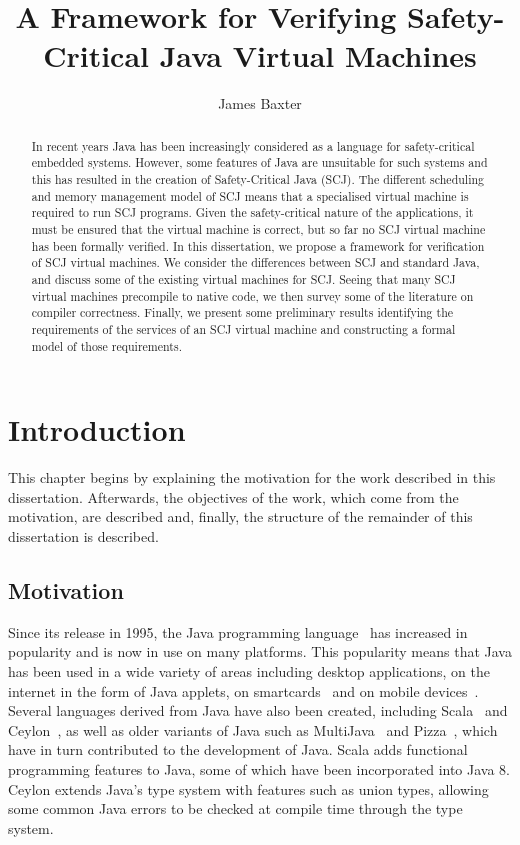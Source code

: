 \documentclass[a4paper,10pt]{report}
\title{A Framework for Verifying Safety-Critical Java Virtual Machines}
\author{James Baxter}
\date{}
\begin{document}
\maketitle

\begin{abstract}
  In recent years Java has been increasingly considered as a language
  for safety-critical embedded systems.
  However, some features of Java are unsuitable for such systems and
  this has resulted in the creation of Safety-Critical Java (SCJ).
  The different scheduling and memory management model of SCJ means
  that a specialised virtual machine is required to run SCJ programs.
  Given the safety-critical nature of the applications, it must be
  ensured that the virtual machine is correct, but so far no SCJ
  virtual machine has been formally verified.
  In this dissertation, we propose a framework for verification of SCJ
  virtual machines.
  We consider the differences between SCJ and standard Java, and
  discuss some of the existing virtual machines for SCJ.
  Seeing that many SCJ virtual machines precompile to native code, we
  then survey some of the literature on compiler correctness.
  Finally, we present some preliminary results identifying the
  requirements of the services of an SCJ virtual machine and
  constructing a formal model of those requirements.
\end{abstract}

\tableofcontents

\chapter{Introduction}

This chapter begins by explaining the motivation for the work
described in this dissertation.
Afterwards, the objectives of the work, which come from the
motivation, are described and, finally, the structure of the remainder
of this dissertation is described.

\section{Motivation}

Since its release in 1995, the Java programming
language~\cite{gosling2013} has increased in popularity and is now in
use on many platforms.
This popularity means that Java has been used in a wide variety of
areas including desktop applications, on the internet in the form of
Java applets, on smartcards~\cite{chen2000} and on mobile
devices~\cite{oracle2014}.
Several languages derived from Java have also been created, including
Scala~\cite{lausanne2015} and Ceylon~\cite{redhat2015}, as well as
older variants of Java such as MultiJava~\cite{clifton2006} and
Pizza~\cite{odersky1997}, which have in turn contributed to the
development of Java.
Scala adds functional programming features to Java, some of which have
been incorporated into Java 8.
Ceylon extends Java's type system with features such as union types,
allowing some common Java errors to be checked at compile time through
the type system.
\end{document}
